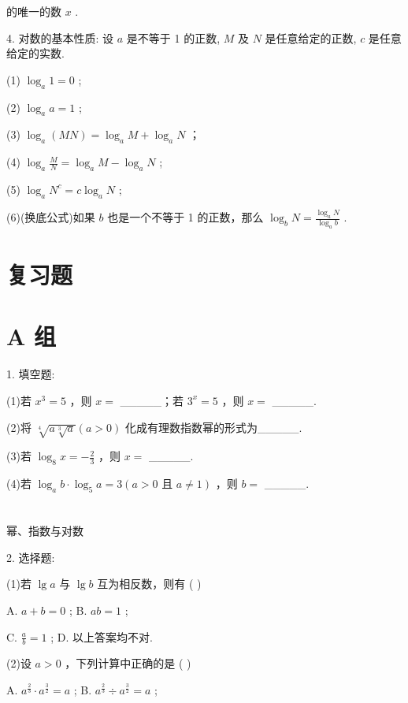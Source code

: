\documentclass[10pt]{article}
\begin{document}
的唯一的数 \(x\) .

4. 对数的基本性质: 设 \(a\) 是不等于 1 的正数, \(M\) 及 \(N\) 是任意给定的正数, \(c\) 是任意给定的实数.

(1) \({\log }_{a}1 = 0\) ;

(2) \({\log }_{a}a = 1\) ;

(3) \({\log }_{a}\left( {MN}\right)  = {\log }_{a}M + {\log }_{a}N\) ；

(4) \({\log }_{a}\frac{M}{N} = {\log }_{a}M - {\log }_{a}N\) ;

(5) \({\log }_{a}{N}^{c} = c{\log }_{a}N\) ;

(6)(换底公式)如果 \(b\) 也是一个不等于 1 的正数，那么 \({\log }_{b}N = \frac{{\log }_{a}N}{{\log }_{a}b}\) .

\section*{复习题}

\section*{A 组}

1. 填空题:

(1)若 \({x}^{3} = 5\) ，则 \(x =\) \_\_\_\_\_；若 \({3}^{x} = 5\) ，则 \(x =\) \_\_\_\_\_.

(2)将 \(\sqrt[4]{a\sqrt[3]{a}}\left( {a > 0}\right)\) 化成有理数指数幂的形式为\_\_\_\_\_.

(3)若 \({\log }_{8}x =  - \frac{2}{3}\) ，则 \(x =\) \_\_\_\_\_.

(4)若 \({\log }_{a}b \cdot  {\log }_{5}a = 3\left( {a > 0\text{ 且 }a \neq  1}\right)\) ，则 \(b =\) \_\_\_\_\_.

\section*{}



幂、指数与对数

2. 选择题:

(1)若 \(\lg a\) 与 \(\lg b\) 互为相反数，则有 ( )

A. \(a + b = 0\) ; B. \({ab} = 1\) ;

C. \(\frac{a}{b} = 1\) ; D. 以上答案均不对.

(2)设 \(a > 0\) ，下列计算中正确的是 ( )

A. \({a}^{\frac{2}{3}} \cdot  {a}^{\frac{3}{2}} = a\) ; B. \({a}^{\frac{2}{3}} \div  {a}^{\frac{3}{2}} = a\) ;
\end{document}
